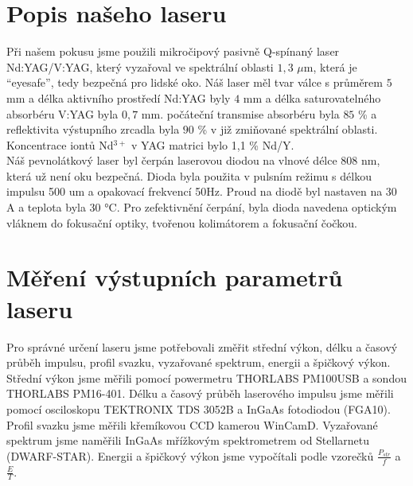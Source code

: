 \documentclass[12pt,a4paper]{article}
\begin{document}
\section{Popis našeho laseru}
Při našem pokusu jsme použili mikročipový pasivně Q-spínaný laser Nd:YAG/V:YAG, který vyzařoval ve spektrální oblasti $1,3$ $\mu$m, která je “eyesafe”, tedy bezpečná pro lidské oko. Náš laser měl tvar válce s průměrem $5$ mm a délka aktivního prostředí Nd:YAG byly $4$ mm a délka saturovatelného absorbéru V:YAG byla $0,7$ mm. počáteční transmise absorbéru byla $85$ \% a reflektivita výstupního zrcadla byla $90$ \% v již zmiňované spektrální oblasti. Koncentrace iontů Nd$^{3+}$ v YAG matrici bylo 1,1 \% Nd/Y. 
\\Náš pevnolátkový laser byl čerpán laserovou diodou na vlnové délce 808 nm, která už není oku bezpečná. Dioda byla použita v pulsním režimu s délkou impulsu 500 um a opakovací frekvencí 50Hz. Proud na diodě byl nastaven na 30 A a teplota byla 30 °C. Pro zefektivnění čerpání, byla dioda navedena optickým vláknem do fokusační optiky, tvořenou kolimátorem a fokusační čočkou.

\section{Měření výstupních parametrů laseru}
Pro správné určení laseru jsme potřebovali změřit střední výkon, délku a časový průběh impulsu, profil svazku, vyzařované spektrum, energii a špičkový výkon. Střední výkon jsme měřili pomocí powermetru THORLABS PM100USB a sondou THORLABS PM16-401. Délku a časový průběh laserového impulsu jsme měřili pomocí osciloskopu TEKTRONIX TDS 3052B a InGaAs fotodiodou (FGA10). Profil svazku jsme měřili křemíkovou CCD kamerou WinCamD. Vyzařované spektrum jsme naměřili InGaAs mřížkovým spektrometrem od Stellarnetu (DWARF-STAR). Energii a špičkový výkon jsme vypočítali podle vzorečků
$\frac{P_{str}}{f}$ a $\frac{E}{T}$.
\end{document}

